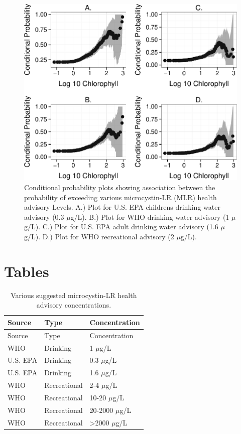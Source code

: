 \documentclass[11pt,]{article}
\begin{document}
\newpage

\begin{figure}[htbp]
\centering
\includegraphics{manuscript_files/figure-latex/epa_child_cp_plot-1.pdf}
\caption{Conditional probability plots showing association between the
probability of exceeding various microcystin-LR (MLR) health advisory
Levels. A.) Plot for U.S. EPA childrens drinking water advisory (0.3
\(\mu\)g/L). B.) Plot for WHO drinking water advisory (1 \(\mu\)g/L).
C.) Plot for U.S. EPA adult drinking water advisory (1.6 \(\mu\)g/L).
D.) Plot for WHO recreational advisory (2 \(\mu\)g/L).
\label{fig:multi_cp_plot}}
\end{figure}

\newpage

\section{Tables}\label{tables}

\begin{longtable}[c]{@{}lll@{}}
\caption{Various suggested microcystin-LR health advisory
concentrations. \label{tab:microcystin_levels}}\tabularnewline
\toprule
Source & Type & Concentration\tabularnewline
\midrule
\endfirsthead
\toprule
Source & Type & Concentration\tabularnewline
\midrule
\endhead
WHO & Drinking & 1 \(\mu\)g/L\tabularnewline
U.S. EPA & Drinking & 0.3 \(\mu\)g/L\tabularnewline
U.S. EPA & Drinking & 1.6 \(\mu\)g/L\tabularnewline
WHO & Recreational & 2-4 \(\mu\)g/L\tabularnewline
WHO & Recreational & 10-20 \(\mu\)g/L\tabularnewline
WHO & Recreational & 20-2000 \(\mu\)g/L\tabularnewline
WHO & Recreational & \textgreater{}2000 \(\mu\)g/L\tabularnewline
\bottomrule
\end{longtable}
\end{document}
